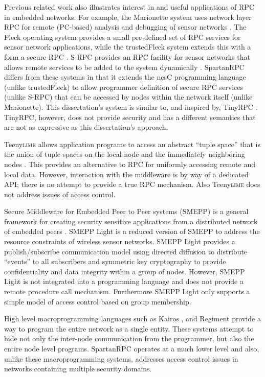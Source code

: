 Previous related work also illustrates interest in and useful applications of RPC in embedded
networks. For example, the Marionette system uses network layer RPC for remote (PC-based)
analysis and debugging of sensor networks \cite{whitehouse-marionette-2006}. The Fleck operating
system provides a small pre-defined set of RPC services for sensor network applications, while
the trustedFleck system extends this with a form a secure RPC
\cite{hu-secfleck-2009,Hu:2010:TTW:1806895.1806900}. S-RPC provides an RPC facility for sensor
networks that allows remote services to be added to the system dynamically \cite{5766863}.
SpartanRPC differs from these systems in that it extends the nesC programming language (unlike
trustedFleck) to allow programmer definition of secure RPC services (unlike S-RPC) that can be
accessed by nodes within the network itself (unlike Marionette). This dissertation's system is similar to, and
inspired by, TinyRPC \cite{may-tinyrpc-2007}.  TinyRPC, however, does not provide security and has
a  different semantics that are not as expressive as this dissertation's approach.

Teeny\textsc{lime} allows application programs to access an abstract ``tuple space'' that is the
union of tuple spaces on the local node and the immediately neighboring nodes
\cite{Costa:2007:PWS:1516124.1516153}. This provides an alternative to RPC for uniformly
accessing remote and local data. However, interaction with the middleware is by way of a
dedicated API; there is no attempt to provide a true RPC mechanism. Also Teeny\textsc{lime} does
not address issues of access control.

Secure Middleware for Embedded Peer to Peer systems (SMEPP) is a general framework for creating
security sensitive applications from a distributed network of embedded peers
\cite{Brogi:2008:SME:1363370.1363548}. SMEPP Light \cite{Vairo:2008:SMW:1594978.1595054} is a
reduced version of SMEPP to address the resource constraints of wireless sensor networks. SMEPP
Light provides a publish/subscribe communication model using directed diffusion
\cite{intanagonwiwat-2003} to distribute ``events'' to all subscribers and symmetric key
cryptography to provide confidentiality and data integrity within a group of nodes. However,
SMEPP Light is not integrated into a programming language and does not provide a remote
procedure call mechanism. Furthermore SMEPP Light only supports a simple model of access control
based on group membership.

High level macro\-programming languages such as Kairos \cite{springerlink:10.1007/1150259312},
and Regiment \cite{Newton:2007:RMS:1236360.1236422} provide a way to program the entire network
as a single entity. These systems attempt to hide not only the inter-node communication from the
programmer, but also the entire node level programs. SpartanRPC operates at a much lower level
and also, unlike these macro\-programming systems, addresses access control issues in networks
containing multiple security domains.

